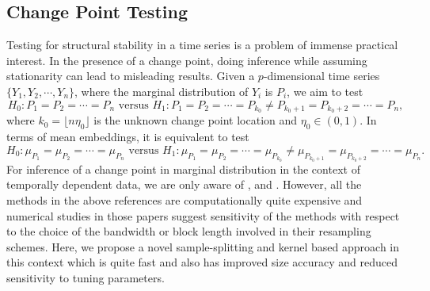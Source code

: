 \documentclass[11pt]{article}
\theoremstyle{plain}
\theoremstyle{definition}
\theoremstyle{remark}
\begin{document}
\subsection{Change Point Testing}\label{sec:method_CPD}
Testing for structural stability in a time series is a problem of immense practical interest. In the presence of a change point, doing inference while assuming stationarity can lead to misleading results. Given a $p$-dimensional time series $\{Y_1,Y_2,\cdots,Y_n\}$, where the marginal distribution of $Y_i$ is $P_i$, we aim to test 
$$H_0:P_1=P_2=\cdots=P_n\text{   versus   } H_1:P_1=P_2=\cdots=P_{k_0}\neq P_{k_0+1}=P_{k_0+2}=\cdots=P_n,$$
where $k_0=\lfloor n \eta_0 \rfloor$ is the unknown change point location and $\eta_0\in (0,1).$ In terms of mean embeddings, it is equivalent to test
$$H_0:\mu_{P_1}=\mu_{P_2}=\cdots=\mu_{P_n}\text{   versus   } H_1:\mu_{P_1}=\mu_{P_2}=\cdots=\mu_{P_{k_0}}\neq \mu_{P_{k_0+1}}=\mu_{P_{k_0+2}}=\cdots=\mu_{P_n}.$$
For inference of a change point in marginal distribution in the context of temporally dependent data, we are only aware of \cite{inoue2001testing}, \cite{sharipov2016sequential} and \cite{bucchia2017change}. However, all the methods  in the above references are computationally quite expensive and numerical studies in those papers suggest sensitivity of the methods with respect to the choice of the bandwidth or block length involved in their resampling schemes. Here, we propose a novel sample-splitting and kernel based approach in this context which is quite fast and also has improved size accuracy and reduced sensitivity to tuning parameters. \\
\end{document}
